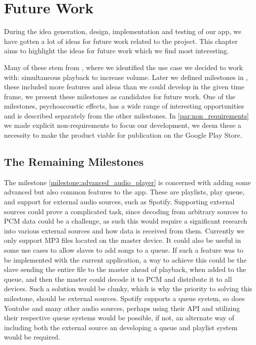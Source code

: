 \chapter{Future Work}\label{cha:future_work}
During the idea generation, design, implementation and testing of our app, we have gotten a lot of ideas for future work related to the project.
This chapter aims to highlight the ideas for future work which we find most interesting.

Many of these stem from , where we identified the use case we decided to work with: simultaneous playback to increase volume.
Later we defined milestones in , these included more features and ideas than we could develop in the given time frame, we present these milestones as candidates for future work.
One of the milestones, psychoacoustic effects, has a wide range of interesting opportunities and is described separately from the other milestones.
In \cref{par:non_requirements} we made explicit non-requirements to focus our development, we deem these a necessity to make the product viable for publication on the Google Play Store.

\section{The Remaining Milestones}
The milestone \ref{milestone:advanced_audio_player} is concerned with adding some advanced but also common features to the app.
These are playlists, play queue, and support for external audio sources, such as Spotify.
Supporting external sources could prove a complicated task, since decoding from arbitrary sources to PCM data could be a challenge, as such this would require a significant research into various external sources and how data is received from them.
Currently we only support MP3 files located on the master device.
It could also be useful in some use cases to allow slaves to add songs to a queue.
If such a feature was to be implemented with the current application, a way to achieve this could be the slave sending the entire file to the master ahead of playback, when added to the queue, and then the master could decode it to PCM and distribute it to all devices.
Such a solution would be clunky, which is why the priority to solving this milestone, should be external sources.
Spotify supports a queue system, so does Youtube and many other audio sources, perhaps using their API and utilizing their respective queue systems would be possible, if not, an alternate way of including both the external source an developing a queue and playlist system would be required.

